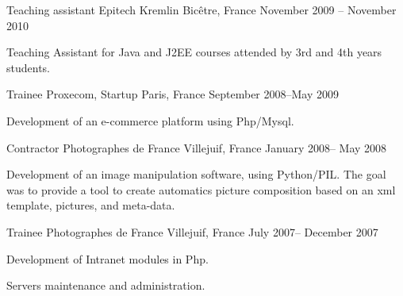 \begin{cventries}
  \cventry
    {Teaching assistant} %
    {Epitech} %
    {Kremlin Bicêtre, France} %
    {November 2009 – November 2010} %
    {
      \begin{cvitems} %
        \item {Teaching Assistant for Java and J2EE courses attended by 3rd and 4th years students.}
      \end{cvitems}
    }

  \cventry
    {Trainee} %
    {Proxecom, Startup} %
    {Paris, France} %
    {September 2008–May 2009} %
    {
      \begin{cvitems} %
        \item {Development of an e-commerce platform using Php/Mysql.}
      \end{cvitems}
    }

  \cventry
    {Contractor} %
    {Photographes de France} %
    {Villejuif, France} %
    {January 2008– May 2008} %
    {
      \begin{cvitems} %
        \item {Development of an image manipulation software, using Python/PIL.
The goal was to provide a tool to create automatics picture composition based on an xml template, pictures, and meta-data.}
        \end{cvitems}
    }

  \cventry
    {Trainee} %
    {Photographes de France} %
    {Villejuif, France} %
    {July 2007– December 2007} %
    {
      \begin{cvitems} %
        \item {Development of Intranet modules in Php.}
        \item {Servers maintenance and administration.}
      \end{cvitems}
    }

\end{cventries}
